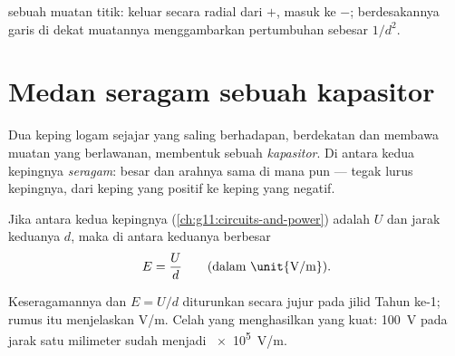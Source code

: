 \begin{omfigure}
\qquad\qquad
{}

{\small {} sebuah muatan titik: keluar secara radial dari $+$,
masuk ke $-$; berdesakannya garis di dekat muatannya menggambarkan
pertumbuhan  sebesar $1/d^2$.}
\end{omfigure}

\section{Medan seragam sebuah kapasitor}

\begin{definition}\label{def:g11:electric-gravitational-fields:capacitor}
Dua keping logam sejajar yang saling berhadapan, berdekatan dan membawa
muatan yang berlawanan, membentuk sebuah
\emph{kapasitor}. Di antara kedua kepingnya 
\emph{seragam}: besar dan arahnya sama di mana pun
--- tegak lurus kepingnya, dari keping yang positif ke keping yang
negatif.
\end{definition}

\begin{proposition}\label{prop:g11:electric-gravitational-fields:uniform}
Jika  antara kedua kepingnya
(\cref{ch:g11:circuits-and-power}) adalah $U$ dan jarak keduanya $d$,
maka  di antara keduanya berbesar
\[
E = \frac{U}{d} \qquad \text{(dalam \unit{V/m})}.
\]
\end{proposition}
\admitted

\begin{remark}
Keseragamannya dan $E = U/d$ diturunkan secara jujur pada jilid Tahun
ke-1; rumus itu menjelaskan  \unit{V/m}. Celah yang 
menghasilkan  yang kuat: \qty{100}{V} pada jarak satu milimeter
sudah menjadi \qty{e5}{V/m}.
\end{remark}

